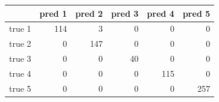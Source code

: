 \begin{tabular}{lrrrrr}
\toprule
 & pred 1 & pred 2 & pred 3 & pred 4 & pred 5 \\
\midrule
true 1 & 114 & 3 & 0 & 0 & 0 \\
true 2 & 0 & 147 & 0 & 0 & 0 \\
true 3 & 0 & 0 & 40 & 0 & 0 \\
true 4 & 0 & 0 & 0 & 115 & 0 \\
true 5 & 0 & 0 & 0 & 0 & 257 \\
\bottomrule
\end{tabular}
